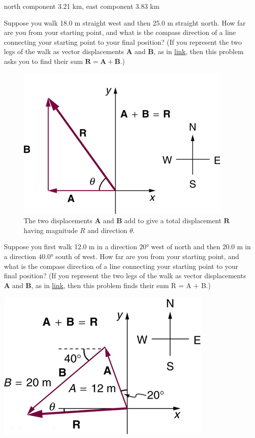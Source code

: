\documentclass[
]{book}
\newenvironment{problems-exercises}{}{}
\begin{document}
\begin{problems-exercises}
\leavevmode\hypertarget{fs-id1165296301840}{}%
north component 3.21 km, east component 3.83 km

\hypertarget{fs-id1165298536705}{}
\leavevmode\hypertarget{fs-id1165296255759}{}%
Suppose you walk 18.0 m straight west and then 25.0 m straight north.
How far are you from your starting point, and what is the compass
direction of a line connecting your starting point to your final
position? (If you represent the two legs of the walk as vector
displacements \(\textbf{A}{}\) and \(\textbf{B}{}\), as in
\protect\hyperlink{import-auto-id1165296241785}{link}, then this
problem asks you to find their sum
\({\textbf{R} = \textbf{A} + \textbf{B}}{}\).)

\begin{figure}
\hypertarget{import-auto-id1165296241785}{%
\centering
\includegraphics{images/Figure_03_02_21a.jpg}
\caption{The two displacements \(\mathbf{A}{}\) and \(\mathbf{B}{}\) add to give a
total displacement \(\mathbf{R}{}\) having magnitude \(R{}\) and direction
\(\theta{}\).}\label{import-auto-id1165296241785}
}
\end{figure}

\hypertarget{fs-id1165298797729}{}
\leavevmode\hypertarget{fs-id1165298797730}{}%
Suppose you first walk 12.0 m in a direction \(\text{20°}{}\) west of
north and then 20.0 m in a direction \(\text{40.0°}{}\) south of west. How
far are you from your starting point, and what is the compass direction
of a line connecting your starting point to your final position? (If you
represent the two legs of the walk as vector displacements
\(\mathbf{A}{}\) and \(\mathbf{B}{}\), as in
\protect\hyperlink{import-auto-id1165296430663}{link}, then this
problem finds their sum \(\text{R~=~A~+~B}{}\).)

\includegraphics{images/Figure_03_02_22a.jpg}


\end{problems-exercises}
\end{document}
